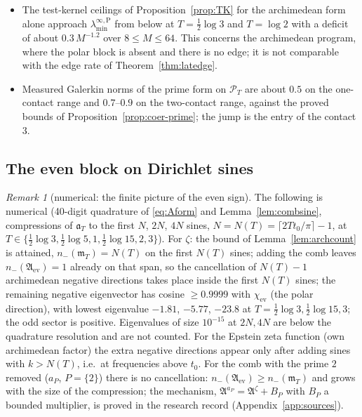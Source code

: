 \documentclass[11pt]{amsart}
\theoremstyle{definition}
\theoremstyle{remark}
\newtheorem{remark}[theorem]{Remark}
\newcommand{\PT}{\mathcal P_T}
\newcommand{\laminfP}{\lambda^{\infty,\mathrm P}_{\min}}
\begin{document}
\begin{itemize}
\item The test-kernel ceilings of Proposition~\ref{prop:TK} for the archimedean form alone approach $\laminfP$ from
below at $T=\frac12\log3$ and $T=\log2$ with a deficit of about $0.3\,M^{-1.2}$ over $8\le M\le64$. This concerns the
archimedean program, where the polar block is absent and there is no edge; it is not comparable with the edge rate of
Theorem~\ref{thm:latedge}.
\item Measured Galerkin norms of the prime form on $\PT$ are about $0.5$ on the one-contact range and $0.7$--$0.9$ on
the two-contact range, against the proved bounds of Proposition~\ref{prop:coer-prime}; the jump is the entry of the
contact $3$.
\end{itemize}


\subsection{The even block on Dirichlet sines}
\begin{remark}[numerical: the finite picture of the even sign]\label{rem:finitesign}
The following is numerical (40-digit quadrature of \eqref{eq:Aform} and Lemma~\ref{lem:combsine}, compressions of
$\mathfrak a_T$ to the first $N$, $2N$, $4N$ sines, $N=N(T)=\lceil2Tt_0/\pi\rceil-1$, at
$T\in\{\frac12\log3,\frac12\log5,1,\frac12\log15,2,3\}$). For $\zeta$: the bound of
Lemma~\ref{lem:archcount} is attained, $n_-(\mathfrak m_T)=N(T)$ on the first $N(T)$ sines; adding the comb leaves
$n_-(\mathfrak A_{\mathrm{ev}})=1$ already on that span, so the cancellation of $N(T)-1$ archimedean negative directions takes
place inside the first $N(T)$ sines; the remaining negative eigenvector has cosine $\ge0.9999$ with $\chi_{\mathrm{ev}}$ (the polar
direction), with lowest eigenvalue $-1.81$, $-5.77$, $-23.8$ at $T=\frac12\log3,\frac12\log15,3$; the odd sector is positive.
Eigenvalues of size $10^{-15}$ at $2N,4N$ are below the quadrature resolution and are not counted. For the Epstein zeta function
(own archimedean factor) the extra negative directions appear only after adding sines with $k>N(T)$, i.e.\ at frequencies above
$t_0$. For the comb with the prime $2$ removed ($a_P$, $P=\{2\}$) there is no cancellation: $n_-(\mathfrak A_{\mathrm{ev}})\ge
n_-(\mathfrak m_T)$ and grows with the size of the compression; the mechanism, $\mathfrak A^{a_P}=\mathfrak A^{\zeta}+B_P$ with
$B_P$ a bounded multiplier, is proved in the research record (Appendix~\ref{app:sources}).
\end{remark}
\end{document}
